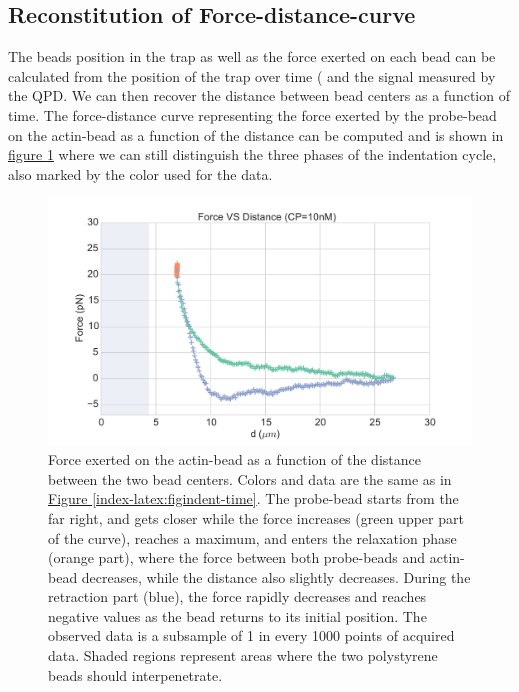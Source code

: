 \documentclass[A4paperpaper,11pt,english]{sphinxmanual}
\begin{document}
\subsection{Reconstitution of Force-distance-curve}
\label{index-latex:reconstitution-of-force-distance-curve}
The beads position in the trap as well as the force exerted on each bead can be
calculated from the position of the trap over time ( and the signal measured by the QPD. We can then recover the distance between bead centers as a function
of time.  The force-distance curve representing the force exerted by the
probe-bead on the actin-bead as a function of the distance can be computed and is
shown in \hyperref[index-latex:force-distance]{figure  \ref*{index-latex:force-distance}} where we can still distinguish the three
phases of the indentation cycle, also marked by the color used for the data.
\begin{figure}[htbp]
\centering
\capstart

\includegraphics[width=0.800\linewidth]{force-distance.pdf}
\caption{Force exerted on the actin-bead as a function of the distance between the
two bead centers. Colors and data are the same as in \hyperref[index-latex:figindent-time]{Figure  \ref*{index-latex:figindent-time}}.
The probe-bead starts from the far right, and gets closer
while the force increases (green upper part of the curve), reaches a
maximum, and enters the relaxation phase (orange part), where the force
between both probe-beads and actin-bead decreases, while the distance  also
slightly decreases. During the retraction part (blue), the force rapidly
decreases and  reaches negative values as   the bead returns to its initial
position. The observed data is a subsample of 1 in every 1000 points of acquired
data. Shaded regions represent areas where the two polystyrene beads should
interpenetrate.}\label{index-latex:force-distance}\end{figure}
\end{document}
